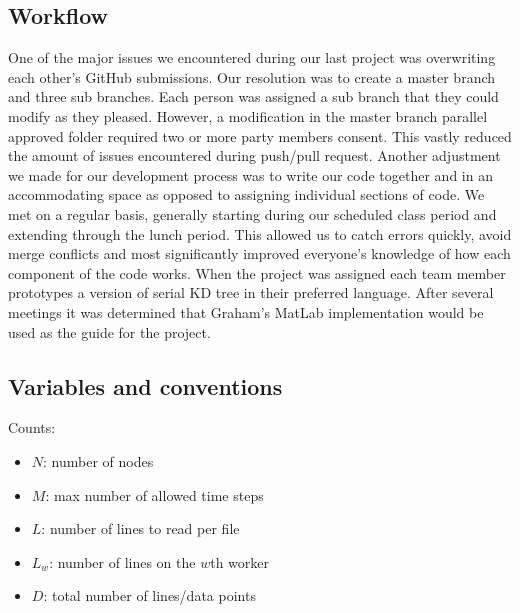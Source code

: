 \documentclass{article}
\begin{document}
\subsection{Workflow}
One of the major issues we encountered during our last project was overwriting each other’s GitHub submissions. Our resolution was to create a master branch and three sub branches. Each person was assigned a sub branch that they could modify as they pleased. However, a modification in the master branch parallel approved folder required two or more party members consent. This vastly reduced the amount of issues encountered during push/pull request. 
Another adjustment we made for our development process was to write our code together and in an accommodating space as opposed to assigning individual sections of code. We met on a regular basis, generally starting during our scheduled class period and extending through the lunch period. This allowed us to catch errors quickly, avoid merge conflicts and most significantly improved everyone's knowledge of how each component of the code works. 
When the project was assigned each team member prototypes a version of serial KD tree in their preferred language. After several meetings it was determined that Graham’s MatLab implementation would be used as the guide for the project. 

\subsection{Variables and conventions}

\begin{mdframed}[backgroundcolor=blue!20]
	Counts:
	\setlength\itemsep{0.1pt}
	\setlength\parskip{0.1pt}
	\begin{itemize}
		\setlength\itemsep{0.1pt}
		\setlength\parskip{0.1pt}
		\item $N$: number of nodes
		\item $M$: max number of allowed time steps
		\item $L$: number of lines to read per file
		\item $L_w$: number of lines on the $w$th worker
		\item $D$: total number of lines/data points
	\end{itemize}
\end{mdframed}
\end{document}
